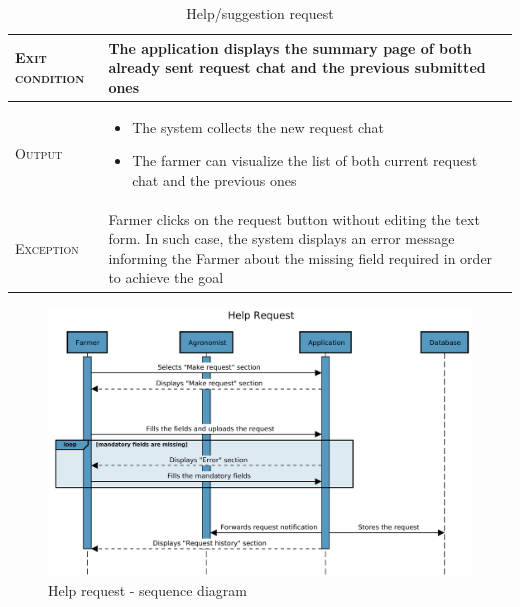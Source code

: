 \begin{table}[H]
\begin{tabular}{|l|m{}|}
        \textsc{Exit condition}    &  The application displays the summary page of both already sent request chat and the previous submitted ones\\
    	\hline %
    	\textsc{Output}             &  \begin{itemize}
    	    \item The system collects the new request chat
    	    \item The farmer can visualize the list of both current request chat and the previous ones
    	\end{itemize}\\
    	\hline %
    	\textsc{Exception}         &  Farmer clicks on the request button without editing the text form. In such case, the system displays an error message informing the Farmer about the missing field required in order to achieve the goal\\
    	\hline %
        
    \end{tabular}
    \caption{\label{tab:Help_request_submission}Help/suggestion request}

\end{table}

\begin{figure}[H]
	\centering
    \includegraphics[page=1, width=\textwidth]{Images/SeqDiag/help_request_seq_diag.pdf}
	\caption{\label{fig:help_request_seq_diag}Help request - sequence diagram}
\end{figure}


